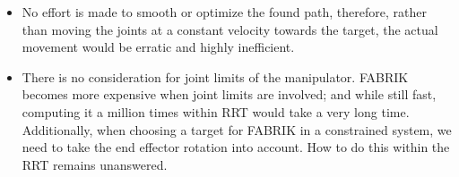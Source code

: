 \begin{itemize}
  \item No effort is made to smooth or optimize the found path, therefore, rather than moving the joints at a constant velocity towards the target, the actual movement would be erratic and highly inefficient.

  \item There is no consideration for joint limits of the manipulator. FABRIK becomes more expensive when joint limits are involved; and while still fast, computing it a million times within RRT would take a very long time. Additionally, when choosing a target for FABRIK in a constrained system, we need to take the end effector rotation into account. How to do this within the RRT remains unanswered.
\end{itemize}
